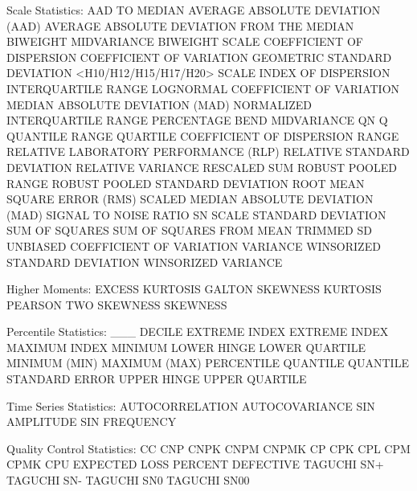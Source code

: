 Scale Statistics:
   AAD TO MEDIAN
   AVERAGE ABSOLUTE DEVIATION (AAD)
   AVERAGE ABSOLUTE DEVIATION FROM THE MEDIAN
   BIWEIGHT MIDVARIANCE
   BIWEIGHT SCALE
   COEFFICIENT OF DISPERSION
   COEFFICIENT OF VARIATION
   GEOMETRIC STANDARD DEVIATION
   <H10/H12/H15/H17/H20> SCALE
   INDEX OF DISPERSION
   INTERQUARTILE RANGE
   LOGNORMAL COEFFICIENT OF VARIATION
   MEDIAN ABSOLUTE DEVIATION (MAD)
   NORMALIZED INTERQUARTILE RANGE
   PERCENTAGE BEND MIDVARIANCE
   QN
   Q QUANTILE RANGE
   QUARTILE COEFFICIENT OF DISPERSION
   RANGE
   RELATIVE LABORATORY PERFORMANCE (RLP)
   RELATIVE STANDARD DEVIATION
   RELATIVE VARIANCE
   RESCALED SUM
   ROBUST POOLED RANGE
   ROBUST POOLED STANDARD DEVIATION
   ROOT MEAN SQUARE ERROR (RMS)
   SCALED MEDIAN ABSOLUTE DEVIATION (MAD)
   SIGNAL TO NOISE RATIO
   SN SCALE
   STANDARD DEVIATION
   SUM OF SQUARES
   SUM OF SQUARES FROM MEAN
   TRIMMED SD
   UNBIASED COEFFICIENT OF VARIATION
   VARIANCE
   WINSORIZED STANDARD DEVIATION
   WINSORIZED VARIANCE

Higher Moments:
   EXCESS KURTOSIS
   GALTON SKEWNESS
   KURTOSIS
   PEARSON TWO SKEWNESS
   SKEWNESS

Percentile Statistics:
   ___ DECILE
   EXTREME 
   INDEX EXTREME
   INDEX MAXIMUM
   INDEX MINIMUM
   LOWER HINGE
   LOWER QUARTILE
   MINIMUM (MIN)
   MAXIMUM (MAX)
   PERCENTILE
   QUANTILE
   QUANTILE STANDARD ERROR
   UPPER HINGE
   UPPER QUARTILE

Time Series Statistics:
   AUTOCORRELATION
   AUTOCOVARIANCE
   SIN AMPLITUDE
   SIN FREQUENCY

Quality Control Statistics:
   CC
   CNP
   CNPK
   CNPM
   CNPMK
   CP
   CPK
   CPL
   CPM
   CPMK
   CPU
   EXPECTED LOSS
   PERCENT DEFECTIVE
   TAGUCHI SN+
   TAGUCHI SN-
   TAGUCHI SN0
   TAGUCHI SN00

